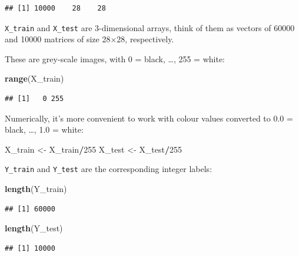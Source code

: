 \documentclass[10pt,b5paper,krantz1]{krantz}
\newenvironment{Shaded}{\begin{snugshade}}{\end{snugshade}}
\newcommand{\DecValTok}[1]{\textcolor[rgb]{0.06,0.06,0.06}{#1}}
\newcommand{\KeywordTok}[1]{\textcolor[rgb]{0.27,0.27,0.27}{\textbf{#1}}}
\newcommand{\NormalTok}[1]{#1}
\newcommand{\OperatorTok}[1]{\textcolor[rgb]{0.43,0.43,0.43}{\textbf{#1}}}
\newcommand{\StringTok}[1]{\textcolor[rgb]{0.5,0.5,0.5}{#1}}
\begin{document}
\begin{verbatim}
## [1] 10000    28    28
\end{verbatim}

\texttt{X\_train} and \texttt{X\_test} are 3-dimensional arrays, think
of them as vectors of 60000 and 10000 matrices of size 28×28, respectively.

These are grey-scale images, with 0 = black, \ldots{}, 255 = white:

\begin{Shaded}
\begin{Highlighting}[]
\KeywordTok{range}\NormalTok{(X_train)}
\end{Highlighting}
\end{Shaded}

\begin{verbatim}
## [1]   0 255
\end{verbatim}

Numerically, it's more convenient to work with colour values
converted to 0.0 = black, \ldots{}, 1.0 = white:

\begin{Shaded}
\begin{Highlighting}[]
\NormalTok{X_train <-}\StringTok{ }\NormalTok{X_train}\OperatorTok{/}\DecValTok{255}
\NormalTok{X_test  <-}\StringTok{ }\NormalTok{X_test}\OperatorTok{/}\DecValTok{255}
\end{Highlighting}
\end{Shaded}

\texttt{Y\_train} and \texttt{Y\_test} are the corresponding integer labels:

\begin{Shaded}
\begin{Highlighting}[]
\KeywordTok{length}\NormalTok{(Y_train)}
\end{Highlighting}
\end{Shaded}

\begin{verbatim}
## [1] 60000
\end{verbatim}

\begin{Shaded}
\begin{Highlighting}[]
\KeywordTok{length}\NormalTok{(Y_test)}
\end{Highlighting}
\end{Shaded}

\begin{verbatim}
## [1] 10000
\end{verbatim}
\end{document}
